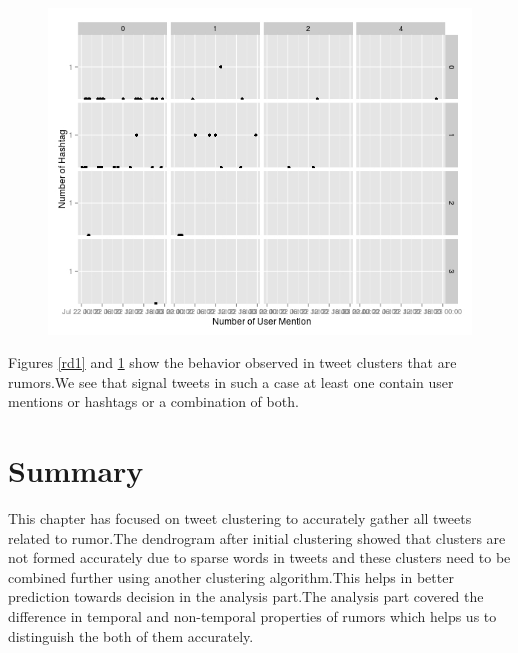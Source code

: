 \begin{figure}[H]
	\centering
	\begin{minipage}{.7\linewidth}
		\includegraphics[width=\linewidth]{images/qp_rumor2.jpeg}
		\label{rd2}
	\end{minipage}
\end{figure}

 Figures \ref{rd1} and \ref{rd2} show the behavior observed in tweet clusters that are rumors.We see that signal tweets in such a case  at least one contain user mentions or hashtags or a combination of both.
 
 \section{Summary}
 
 This chapter has focused on tweet clustering to accurately gather all tweets related to rumor.The dendrogram after initial clustering showed that clusters are not formed accurately due to sparse words in tweets and these clusters need to be combined further using another clustering algorithm.This helps in better prediction towards decision in the analysis part.The analysis part covered the difference in temporal and non-temporal properties of rumors which helps us to distinguish the both of them accurately.  	